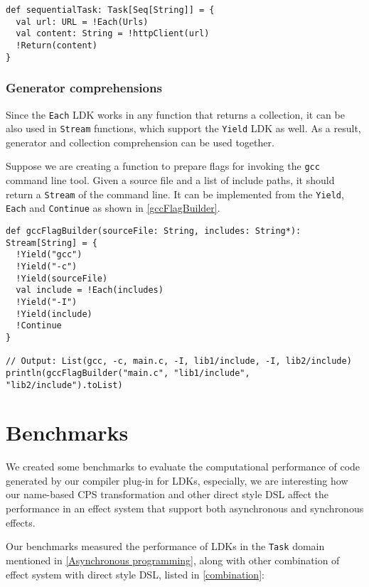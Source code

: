 \begin{lstlisting}[caption={Using HTTP client in parallel},label={usingHttpClientSequentially}]
def sequentialTask: Task[Seq[String]] = {
  val url: URL = !Each(Urls)
  val content: String = !httpClient(url)
  !Return(content)
}
\end{lstlisting}

\subsubsection{Generator comprehensions}\label{Generator comprehensions}

Since the \lstinline{Each} LDK works in any function that returns a collection, it can be also used in \lstinline{Stream} functions, which support the \lstinline{Yield} LDK as well. As a result, generator and collection comprehension can be used together.

Suppose we are creating a function to prepare flags for invoking the \texttt{gcc} command line tool. Given a source file and a list of include paths, it should return a \lstinline{Stream} of the command line.
It can be implemented from the \lstinline{Yield}, \lstinline{Each} and \lstinline{Continue} as shown in \cref{gccFlagBuilder}.

\begin{lstlisting}[caption={Build a command-line by using generator and collection comprehension together},label={gccFlagBuilder}]
def gccFlagBuilder(sourceFile: String, includes: String*): Stream[String] = {
  !Yield("gcc")
  !Yield("-c")
  !Yield(sourceFile)
  val include = !Each(includes)
  !Yield("-I")
  !Yield(include)
  !Continue
}

// Output: List(gcc, -c, main.c, -I, lib1/include, -I, lib2/include)
println(gccFlagBuilder("main.c", "lib1/include", "lib2/include").toList)
\end{lstlisting}

\section{Benchmarks}\label{Benchmarks}

We created some benchmarks to evaluate the computational performance of code generated by our compiler plug-in for LDKs, especially, we are interesting how our name-based CPS transformation and other direct style DSL affect the performance in an effect system that support both asynchronous and synchronous effects.

Our benchmarks measured the performance of LDKs in the \lstinline{Task} domain mentioned in \cref{Asynchronous programming}, along with other combination of effect system with direct style DSL, listed in \cref{combination}:

